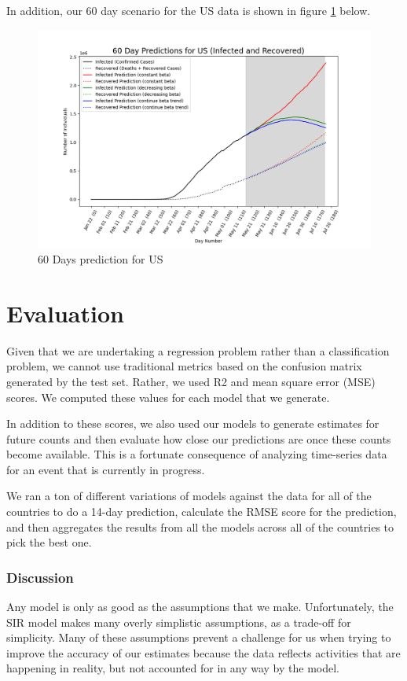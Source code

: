 \documentclass[11pt]{article}
\begin{document}
In addition, our 60 day scenario for the US data is shown in figure \ref{fig:60-days-prediction-us} below. 

\begin{figure}[h]
    \includegraphics[width=16cm]{images/60-days-prediction-US.png}
    \centering
    \caption{60 Days prediction for US}
    \label{fig:60-days-prediction-us}
\end{figure}

\section{Evaluation}
Given that we are undertaking a regression problem rather than a classification problem, we cannot use traditional metrics based on the confusion matrix generated by the test set.  Rather, we used R2 and mean square error (MSE) scores. We computed these values for each model that we generate. 

In addition to these scores, we also used our models to generate estimates for future counts and then evaluate how close our predictions are once these counts become available. This is a fortunate consequence of analyzing time-series data for an event that is currently in progress.

We ran a ton of different variations of models against the data for all of the countries to do a 14-day prediction, calculate the RMSE score for the prediction, and then aggregates the results from all the models across all of the countries to pick the best one.

\subsubsection{Discussion}
Any model is only as good as the assumptions that we make. Unfortunately, the SIR model makes many overly simplistic assumptions, as a trade-off for simplicity. Many of these assumptions prevent a challenge for us when trying to improve the accuracy of our estimates because the data reflects activities that are happening in reality, but not accounted for in any way by the model.
\end{document}
